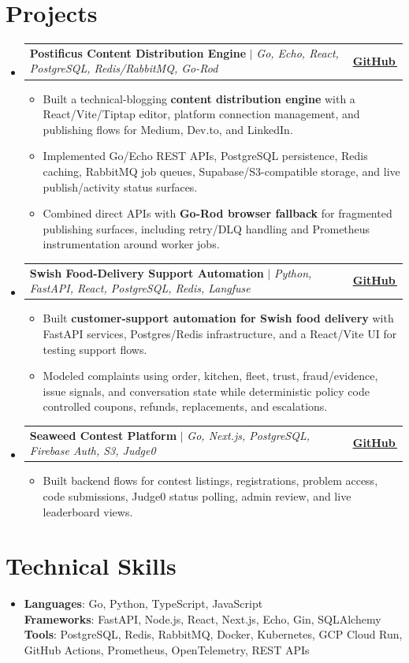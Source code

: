 \documentclass[letterpaper,11pt]{article}
\makeatletter
\newcommand{\bodyhref}[2]{\href{#1}{\underline{#2}\,\faExternalLink*}}
\newcommand{\resumeItem}[1]{\item{\fontsize{8.82pt}{9.28pt}\selectfont #1\vspace{-0.7pt}}}
\newcommand{\resumeProjectHeading}[2]{
    \item
    \begin{tabular*}{1.0\textwidth}{l@{\extracolsep{\fill}}r}
      \small#1 & \textbf{\small #2}\\
    \end{tabular*}\vspace{-4pt}
}
\newcommand{\resumeSubHeadingListStart}{\begin{itemize}[leftmargin=0.0in, label={}, itemsep=0.6pt, topsep=0pt, parsep=0pt, partopsep=0pt]}
\newcommand{\resumeSubHeadingListEnd}{\end{itemize}}
\newcommand{\resumeItemListStart}{\begin{itemize}[leftmargin=0.16in,itemsep=0.3pt,topsep=0.9pt,parsep=0pt,partopsep=0pt]}
\newcommand{\resumeItemListEnd}{\end{itemize}\vspace{-3pt}}
\makeatother
\begin{document}
\section{Projects}
\resumeSubHeadingListStart
\resumeProjectHeading
{\textbf{Postificus Content Distribution Engine} $|$ \emph{Go, Echo, React, PostgreSQL, Redis/RabbitMQ, Go-Rod}}{\bodyhref{https://github.com/unichronic/postificus}{GitHub}}
\resumeItemListStart
\resumeItem{Built a technical-blogging \textbf{content distribution engine} with a React/Vite/Tiptap editor, platform connection management, and publishing flows for Medium, Dev.to, and LinkedIn.}
\resumeItem{Implemented Go/Echo REST APIs, PostgreSQL persistence, Redis caching, RabbitMQ job queues, Supabase/S3-compatible storage, and live publish/activity status surfaces.}
\resumeItem{Combined direct APIs with \textbf{Go-Rod browser fallback} for fragmented publishing surfaces, including retry/DLQ handling and Prometheus instrumentation around worker jobs.}
\resumeItemListEnd
\resumeProjectHeading
{\textbf{Swish Food-Delivery Support Automation} $|$ \emph{Python, FastAPI, React, PostgreSQL, Redis, Langfuse}}{\bodyhref{https://github.com/unichronic/swishagent}{GitHub}}
\resumeItemListStart
\resumeItem{Built \textbf{customer-support automation for Swish food delivery} with FastAPI services, Postgres/Redis infrastructure, and a React/Vite UI for testing support flows.}
\resumeItem{Modeled complaints using order, kitchen, fleet, trust, fraud/evidence, issue signals, and conversation state while deterministic policy code controlled coupons, refunds, replacements, and escalations.}
\resumeItemListEnd
\resumeProjectHeading
{\textbf{Seaweed Contest Platform} $|$ \emph{Go, Next.js, PostgreSQL, Firebase Auth, S3, Judge0}}{\bodyhref{https://github.com/unichronic/seaweed-fe}{GitHub}}
\resumeItemListStart
\resumeItem{Built backend flows for contest listings, registrations, problem access, code submissions, Judge0 status polling, admin review, and live leaderboard views.}
\resumeItemListEnd
\resumeSubHeadingListEnd

\section{Technical Skills}
\begin{itemize}[leftmargin=0.15in, label={}, topsep=0pt, itemsep=0pt, parsep=0pt, partopsep=0pt]
  \item{\fontsize{9.0pt}{9.25pt}\selectfont
   \textbf{Languages}{: Go, Python, TypeScript, JavaScript} \\
   \textbf{Frameworks}{: FastAPI, Node.js, React, Next.js, Echo, Gin, SQLAlchemy} \\
   \textbf{Tools}{: PostgreSQL, Redis, RabbitMQ, Docker, Kubernetes, GCP Cloud Run, GitHub Actions, Prometheus, OpenTelemetry, REST APIs} \\
  }
\end{itemize}
\end{document}
